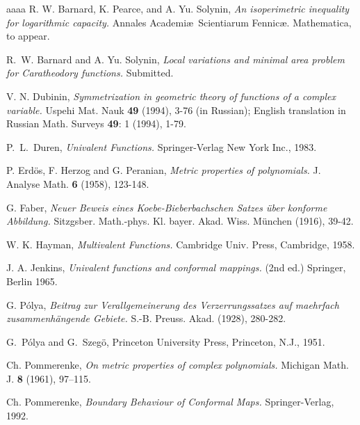 \documentclass[11pt]{pjm}
\begin{document}
\begin{thebibliography}{aaaa}
 R. W. Barnard, K. Pearce, and A. Yu. Solynin, \textit{An isoperimetric inequality for logarithmic capacity.} 
 Annales Academi\ae\  Scientiarum Fennic\ae. Mathematica,
to appear.

 R.~W. Barnard and A. Yu. Solynin, \textit{Local variations and minimal area problem for Caratheodory functions.}  Submitted.

 V. N. Dubinin, \textit{Symmetrization in geometric theory of functions of a complex variable.} 
 Uspehi Mat. Nauk \textbf{49} (1994), 3-76 (in Russian); English translation in Russian Math. Surveys \textbf{49}: 1 (1994), 1-79.

 P.~L.~Duren,  \textit{Univalent Functions.}  Springer-Verlag New York Inc., 1983.

 P. Erd\"os, F. Herzog and G. Peranian, \textit{Metric properties of polynomials.}  J. Analyse Math. \textbf{6} (1958), 123-148.

 G. Faber, \textit{Neuer Beweis eines Koebe-Bieberbachschen Satzes {\" u}ber konforme Abbildung. } 
Sitzgsber.  Math.-phys. Kl. bayer. Akad. Wiss. M{\"u}nchen  (1916), 39-42.


 W. K. Hayman, \textit{Multivalent Functions.}  Cambridge Univ. Press, Cambridge, 1958.

 J. A. Jenkins, \textit{Univalent functions and conformal mappings.} (2nd ed.) Springer, Berlin 1965.


 G. P{\' o}lya, \textit{Beitrag zur Verallgemeinerung des Verzerrungssatzes auf maehrfach 
zusammenh{\" a}ngende Gebiete.}   S.-B. Preuss. Akad. (1928), 280-282.


 G.~P\'{o}lya and G.~Szeg\"{o},  
Princeton University Press, Princeton, N.J., 1951.

 Ch. Pommerenke, \textit{On metric properties of complex polynomials.}  Michigan Math. J. {\bf 8} (1961), 97--115.

 Ch. Pommerenke, \textit{Boundary Behaviour of Conformal Maps.} Springer-Verlag, 1992.

\end{thebibliography}
\end{document}
